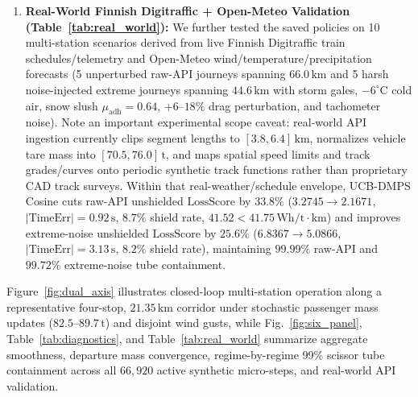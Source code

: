 \documentclass[10pt,a4paper]{article}
\begin{document}
\begin{enumerate}
    \item \textbf{Real-World Finnish Digitraffic + Open-Meteo Validation (Table~\ref{tab:real_world}):} We further tested the saved policies on 10 multi-station scenarios derived from live Finnish Digitraffic train schedules/telemetry and Open-Meteo wind/temperature/precipitation forecasts (5 unperturbed raw-API journeys spanning $66.0\,\text{km}$ and 5 harsh noise-injected extreme journeys spanning $44.6\,\text{km}$ with storm gales, $-6^\circ\text{C}$ cold air, snow slush $\mu_{\text{adh}}=0.64$, $+6\text{--}18\%$ drag perturbation, and tachometer noise). Note an important experimental scope caveat: real-world API ingestion currently clips segment lengths to $[3.8, 6.4]\,\text{km}$, normalizes vehicle tare mass into $[70.5, 76.0]\,\text{t}$, and maps spatial speed limits and track grades/curves onto periodic synthetic track functions rather than proprietary CAD track surveys. Within that real-weather/schedule envelope, UCB-DMPS Cosine cuts raw-API unshielded $\text{LossScore}$ by $33.8\%$ ($3.2745 \to 2.1671$, $|\text{TimeErr}| = 0.92\,\text{s}$, $8.7\%$ shield rate, $41.52 < 41.75\,\text{Wh/t}\cdot\text{km}$) and improves extreme-noise unshielded $\text{LossScore}$ by $25.6\%$ ($6.8367 \to 5.0866$, $|\text{TimeErr}| = 3.13\,\text{s}$, $8.2\%$ shield rate), maintaining $99.99\%$ raw-API and $99.72\%$ extreme-noise tube containment.
\end{enumerate}

Figure~\ref{fig:dual_axis} illustrates closed-loop multi-station operation along a representative four-stop, $21.35\,\text{km}$ corridor under stochastic passenger mass updates ($82.5\text{--}89.7\,\text{t}$) and disjoint wind gusts, while Fig.~\ref{fig:six_panel}, Table~\ref{tab:diagnostics}, and Table~\ref{tab:real_world} summarize aggregate smoothness, departure mass convergence, regime-by-regime 99\% scissor tube containment across all $66,920$ active synthetic micro-steps, and real-world API validation.
\end{document}
